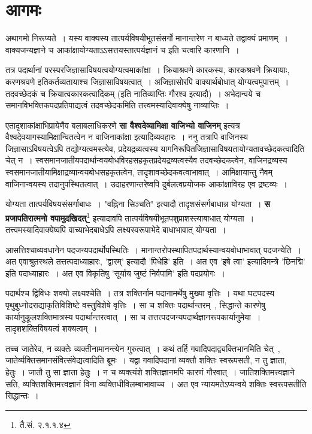\section{आगमः}\par
	अथागमो निरूप्यते~। यस्य वाक्यस्य तात्पर्यविषयीभूतसंसर्गो मानान्तरेण न बाध्यते तद्वाक्यं प्रमाणम्~। वाक्यजन्यज्ञाने च आकांक्षायोग्यताऽऽसत्तयस्तात्पर्यज्ञानं च इति चत्वारि कारणानि~।\par
	तत्र पदार्थानां परस्परजिज्ञासाविषयत्वयोग्यत्वमाकांक्षा~। क्रियाश्रवणे कारकस्य, कारकश्रवणे क्रियायाः, करणश्रवणे इतिकर्तव्यतायाश्च जिज्ञासाविषयत्वात्~। अजिज्ञासोरपि वाक्यार्थबोधात् योग्यत्वमुपात्तम्~। तदवच्छेदकं च क्रियात्वकारकत्वादिकम् (इति नातिव्याप्तिः गौरश्व इत्यादौ)~। अभेदान्वये च समानविभक्तिकपदप्रतिपाद्यत्वं तदवच्छेदकमिति तत्त्वमस्यादिवाक्येषु नाव्याप्तिः~।\par
	एतादृशाकांक्षाभिप्रायेणैव बलाबलाधिकरणे {\bfseries सा वैश्वदेव्यामिक्षा वाजिभ्यो वाजिनम्} इत्यत्र वैश्वदेवयागस्यामिक्षान्वितत्वेन न वाजिनाकांक्षा इत्यादिव्यवहारः~। ननु तत्रापि वाजिनस्य जिज्ञासाऽविषयत्वेऽपि तद्योग्यत्वमस्त्येव, प्रदेयद्रव्यत्वस्य यागनिरूपितजिज्ञासाविषयतायोग्यतावच्छेदकत्वादिति चेत् न~। स्वसमानजातीयपदार्थान्वयबोधविरहसहकृतप्रदेयद्रव्यत्वस्यैव तदवच्छेदकत्वेन, वाजिनद्रव्यस्य स्वसमानजातीयामिक्षाद्रव्यान्वयबोधसहकृतत्वेन, तादृशावच्छेदकवत्वाभावात्~। आमिक्षायान्तु नैवम् वाजिनान्वयस्य तदानुपस्थितत्वात्~। उदाहरणान्तरेष्वपि दुर्बलत्वप्रयोजक आकांक्षाविरह एव द्रष्टव्यः~।\par
	योग्यता तात्पर्यविषयसंसर्गाबाधः~। "वह्निना सिञ्चति" इत्यादौ तादृशसंसर्गबाधान्न योग्यता~। {\bfseries स प्रजापतिरात्मनो वपामुदखिदत्}\footnote{तै.सं. २.१.१.४} इत्यादावपि तात्पर्यविषयीभूतपशुप्राशस्त्याबाधात् योग्यता~। तत्त्वमस्यादिवाक्येष्वपि वाच्याभेदबाधेऽपि लक्ष्यस्वरूपाभेदे बाधाभावात् योग्यता~।\par
	आसत्तिश्चाव्यवधानेन पदजन्यपदार्थोपस्थितिः~। मानान्तरोपस्थापितपदार्थस्यान्वयबोधाभावात् पदजन्येति~। अत एवाश्रुतस्थले तत्तत्पदाध्याहारः, 'द्वारम्' इत्यादौ 'पिधेहि' इति~। अत एव 'इषे त्वा' इत्यादिमन्त्रे 'छिनद्मि' इति पदाध्याहारः~। अत एव विकृतिषु 'सूर्याय जुष्टं निर्वपामि' इति पदप्रयोगः~।\par
	पदार्थश्च द्विविधः शक्यो लक्ष्यश्चेति~। तत्र शक्तिर्नाम पदानामर्थेषु मुख्या वृत्तिः~। यथा घटपदस्य पृथुबुध्नोदराद्याकृतिविशिष्टे वस्तुविशेषे वृत्तिः~। सा च शक्तिः पदार्थान्तरम्~, सिद्धान्ते कारणेषु कार्यानुकूलशक्तिमात्रस्य पदार्थान्तरत्वात्~। सा च तत्तत्पदजन्यपदार्थज्ञानरूपकार्यानुमेया~। तादृशशक्तिविषयत्वं शक्यत्वम्~।\par
	तच्च जातेरेव, न व्यक्तेः व्यक्तीनामानन्त्येन गुरुत्वात्~। कथं तर्हि गवादिपदाद्व्यक्तिभानमिति चेत्~, जातेर्व्यक्तिसमानसंवित्संवेद्यत्वादिति ब्रूमः~। यद्वा गवादिपदानां व्यक्तौ शक्तिः स्वरूपसती, न तु ज्ञाता, हेतुः~। जातौ तु सा ज्ञाता हेतुः~। न च व्यक्त्यंशे शक्तिज्ञानमपि कारणं गौरवात्~। जातिशक्तिमत्त्वज्ञाने सति, व्यक्तिशक्तिमत्त्वज्ञानं विना व्यक्तिधीविलम्बाभावाच्च~। अत एव न्यायमतेऽप्यन्वये शक्तिः स्वरूपसतीति सिद्धान्तः~।\par
